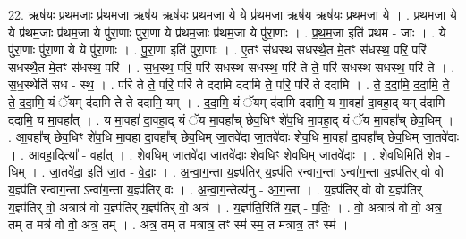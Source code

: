 \documentclass[17pt]{extarticle}
\begin{document}
22. ऋष॑यः प्रथम॒जाः प्र॑थम॒जा ऋष॑य॒ ऋष॑यः प्रथम॒जा ये ये प्र॑थम॒जा ऋष॑य॒ ऋष॑यः प्रथम॒जा ये । . प्र॒थ॒म॒जा ये ये प्र॑थम॒जाः प्र॑थम॒जा ये पु॑रा॒णाः पु॑रा॒णा ये प्र॑थम॒जाः प्र॑थम॒जा ये पु॑रा॒णाः । . प्र॒थ॒म॒जा इति॑ प्रथम - जाः । . ये पु॑रा॒णाः पु॑रा॒णा ये ये पु॑रा॒णाः । . पु॒रा॒णा इति॑ पुरा॒णाः । . ए॒तꣳ स॑धस्थ सधस्थै॒त मे॒तꣳ स॑धस्थ॒ परि॒ परि॑ सधस्थै॒त मे॒तꣳ स॑धस्थ॒ परि॑ । . स॒ध॒स्थ॒ परि॒ परि॑ सधस्थ सधस्थ॒ परि॑ ते ते॒ परि॑ सधस्थ सधस्थ॒ परि॑ ते । . स॒ध॒स्थेति॑ सध - स्थ॒ । . परि॑ ते ते॒ परि॒ परि॑ ते ददामि ददामि ते॒ परि॒ परि॑ ते ददामि । . ते॒ द॒दा॒मि॒ द॒दा॒मि॒ ते॒ ते॒ द॒दा॒मि॒ यं ॅयम् द॑दामि ते ते ददामि॒ यम् । . द॒दा॒मि॒ यं ॅयम् द॑दामि ददामि॒ य मा॒वहा॑ दा॒वहा॒द् यम् द॑दामि ददामि॒ य मा॒वहा᳚त् । . य मा॒वहा॑ दा॒वहा॒द् यं ॅय मा॒वहा᳚च् छेव॒धिꣳ शे॑व॒धि मा॒वहा॒द् यं ॅय मा॒वहा᳚च् छेव॒धिम् । . आ॒वहा᳚च् छेव॒धिꣳ शे॑व॒धि मा॒वहा॑ दा॒वहा᳚च् छेव॒धिम् जा॒तवे॑दा जा॒तवे॑दाः शेव॒धि मा॒वहा॑ दा॒वहा᳚च् छेव॒धिम् जा॒तवे॑दाः । . आ॒वहा॒दित्या᳚ - वहा᳚त् । . शे॒व॒धिम् जा॒तवे॑दा जा॒तवे॑दाः शेव॒धिꣳ शे॑व॒धिम् जा॒तवे॑दाः । . शे॒व॒धिमिति॑ शेव - धिम् । . जा॒तवे॑दा॒ इति॑ जा॒त - वे॒दाः॒ । . अ॒न्वा॒ग॒न्ता य॒ज्ञ्प॑तिर् य॒ज्ञ्प॑ति रन्वाग॒न्ता ऽन्वा॑ग॒न्ता य॒ज्ञ्प॑तिर् वो वो य॒ज्ञ्प॑ति रन्वाग॒न्ता ऽन्वा॑ग॒न्ता य॒ज्ञ्प॑तिर् वः । . अ॒न्वा॒ग॒न्तेत्य॑नु - आ॒ग॒न्ता । . य॒ज्ञ्प॑तिर् वो वो य॒ज्ञ्प॑तिर् य॒ज्ञ्प॑तिर् वो॒ अत्रात्र॑ वो य॒ज्ञ्प॑तिर् य॒ज्ञ्प॑तिर् वो॒ अत्र॑ । . य॒ज्ञ्प॑ति॒रिति॑ य॒ज्ञ् - प॒तिः॒ । . वो॒ अत्रात्र॑ वो वो॒ अत्र॒ तम् त मत्र॑ वो वो॒ अत्र॒ तम् । . अत्र॒ तम् त मत्रात्र॒ तꣳ स्म॑ स्म॒ त मत्रात्र॒ तꣳ स्म॑ । \newline
\end{document}
